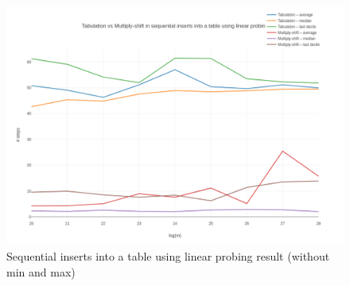 \documentclass{article}
\begin{document}
\begin{figure}[h!]
\centering
\includegraphics[width=\textwidth]{1b.png}
\caption{Sequential inserts into a table using linear probing result (without min and max)}
\label{fig:plot2b}
\end{figure}
\end{document}
